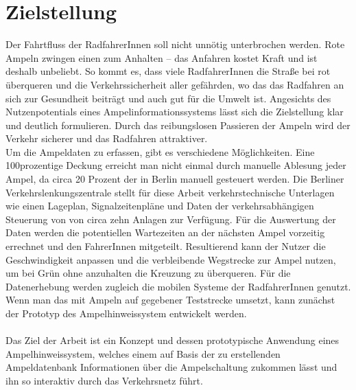 \section{Zielstellung}
Der Fahrtfluss der RadfahrerInnen soll nicht unnötig unterbrochen werden. Rote Ampeln zwingen einen zum Anhalten -- das Anfahren kostet Kraft und ist deshalb unbeliebt. So kommt es, dass viele RadfahrerInnen die Straße bei rot überqueren und die Verkehrssicherheit aller gefährden, wo das das Radfahren an sich zur Gesundheit beiträgt und auch gut für die Umwelt ist. Angesichts des Nutzenpotentials eines Ampelinformationssystems lässt sich die Zielstellung klar und deutlich formulieren. Durch das reibungslosen Passieren der Ampeln wird der Verkehr sicherer und das Radfahren attraktiver.\\
Um die Ampeldaten zu erfassen, gibt es verschiedene Möglichkeiten. Eine 100prozentige Deckung erreicht man nicht einmal durch manuelle Ablesung jeder Ampel, da circa 20 Prozent der  in Berlin manuell gesteuert werden. Die Berliner Verkehrslenkungszentrale stellt für diese Arbeit verkehrstechnische Unterlagen wie einen Lageplan, Signalzeitenpläne und Daten der verkehrsabhängigen Steuerung von  von circa zehn Anlagen zur Verfügung.
Für die Auswertung der Daten werden die potentiellen Wartezeiten an der nächsten Ampel vorzeitig errechnet und den FahrerInnen mitgeteilt. Resultierend kann der Nutzer die Geschwindigkeit anpassen und die verbleibende Wegstrecke zur Ampel nutzen, um bei Grün ohne anzuhalten die Kreuzung zu überqueren. Für die Datenerhebung werden zugleich die mobilen Systeme der RadfahrerInnen genutzt.  Wenn man das mit Ampeln auf gegebener Teststrecke umsetzt, kann zunächst der Prototyp des Ampelhinweissystem entwickelt werden.\\\\
Das Ziel der Arbeit ist ein Konzept und dessen prototypische Anwendung eines Ampelhinweissystem, welches einem auf Basis der zu erstellenden  Ampeldatenbank Informationen über die Ampelschaltung zukommen lässt und ihn so interaktiv durch das Verkehrsnetz führt.
